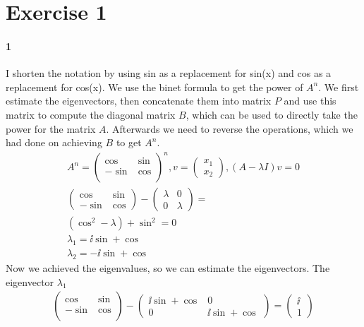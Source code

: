 \section{Exercise 1}

\paragraph*{1}
I shorten the notation by using sin as a replacement for sin(x) and cos as a replacement for cos(x).
We use the binet formula to get the power of $A^n$.
We first estimate the eigenvectors, then concatenate them into matrix $P$ and use this matrix to compute the diagonal matrix $B$, which can be used to directly take the power for the matrix $A$. Afterwards we need to reverse the operations, which we had done on achieving $B$ to get $A^n$.
\begin{gather*}
A^n =
\left( \begin{array}{cc}
\cos & \sin \\
-\sin & \cos \\
\end{array} \right)^n , v = \left( \begin{array}{c} x_1\\x_2 \end{array} \right), ( A-\lambda I )v = 0
\\
\left( \begin{array}{cc}
\cos & \sin \\
- \sin & \cos 
\end{array}
\right) -
\left( \begin{array}{cc}
\lambda & 0 \\
0 & \lambda
\end{array} 
\right)
= \\
(\cos ^2 - \lambda) + \sin ^2 = 0 \\
\lambda _1 = \ii \sin + \cos \\
\lambda _2 = - \ii \sin + \cos
\end{gather*}
Now we achieved the eigenvalues, so we can estimate the eigenvectors.
The eigenvector $\lambda _1$
\begin{gather*}
\left( \begin{array}{cc}
\cos & \sin \\
- \sin & \cos \\
\end{array} 
\right)
-
\left( \begin{array}{cc}
\ii \sin + \cos & 0\\
0 & \ii \sin + \cos 
\end{array} 
\right)
=
\left( \begin{array}{c}
\ii \\
1 
\end{array}
\right)
\end{gather*}
